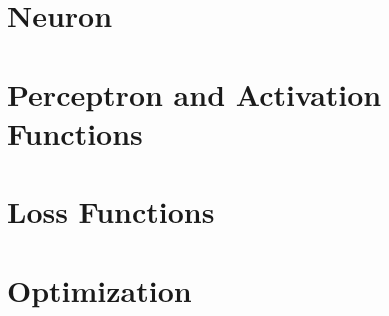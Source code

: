 \section{Neuron}


\section{Perceptron and Activation Functions}


\section{Loss Functions}


\section{Optimization}

